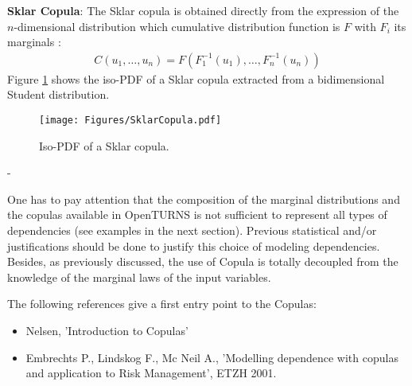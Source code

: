 {  {\bf Sklar Copula}: The Sklar copula is obtained directly from the expression of the $n$-dimensional distribution which cumulative distribution function is $F$ with $F_i$ its marginals :
  \begin{align*}
    C(u_1, \dots, u_n) = F(F_1^{-1}(u_1), \dots, F_n^{-1}(u_n))
  \end{align*}
  Figure \ref{SklarEx} shows the iso-PDF of a Sklar copula extracted from a bidimensional Student distribution.

  \begin{figure}[H]
    \begin{center}
      \texttt{[image: Figures/SklarCopula.pdf]}
      \caption{Iso-PDF of a  Sklar copula.\label{SklarEx}}
    \end{center}
  \end{figure}



}

{
  -
}

{
  One has to pay attention that the composition of the marginal distributions and the copulas available in OpenTURNS is not sufficient to represent all types of dependencies (see examples in the next section). Previous statistical and/or justifications should be done to justify this choice of modeling  dependencies. Besides, as previously discussed, the use of Copula is totally decoupled from the knowledge of the marginal laws of the input variables.

  The following references give a first entry point to the Copulas:
  \begin{itemize}
  \item Nelsen, 'Introduction to Copulas'

  \item Embrechts P., Lindskog F., Mc Neil A., 'Modelling dependence with copulas and application to Risk Management', ETZH 2001.

  \end{itemize}
}

\Example{

  -
}
